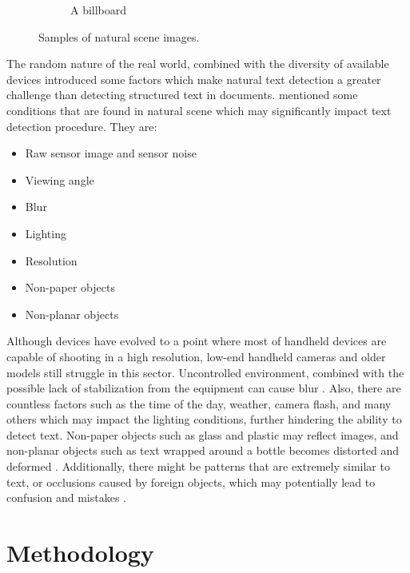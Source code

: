 \documentclass[10pt, a4paper]{article}
\begin{document}
\begin{figure}[h!]
\begin{subfigure}[b]{0.4\linewidth}
		\caption{A billboard}
	  \end{subfigure}
	\caption{Samples of natural scene images.}
	\label{fig:samples}
  \end{figure}

The random nature of the real world, combined with the diversity of available devices introduced some factors which make natural text detection a greater challenge than detecting structured text in documents. \cite{NaturalScene} mentioned some conditions that are found in natural scene which may significantly impact text detection procedure. They are:
\begin{itemize}
	\item Raw sensor image and sensor noise
	\item Viewing angle
	\item Blur
	\item Lighting
	\item Resolution
	\item Non-paper objects
	\item Non-planar objects
\end{itemize}
Although devices have evolved to a point where most of handheld devices are capable of shooting in a high resolution, low-end handheld cameras and older models still struggle in this sector.
Uncontrolled environment, combined with the possible lack of stabilization from the equipment can cause blur \citep{Rosebrockeast}. Also, there are countless factors such as the time of the day, weather, camera flash, and many others which may impact the lighting conditions, further hindering the ability to detect text. Non-paper objects such as glass and plastic may reflect images, and non-planar objects such as text wrapped around a bottle becomes distorted and deformed \citep{Rosebrockeast}.
Additionally, there might be patterns that are extremely similar to text, or occlusions caused by foreign objects, which may potentially lead to confusion and mistakes \citep{LongEtAl}.

\clearpage

\section{Methodology} %
\label{sec:methodology}
\end{document}
